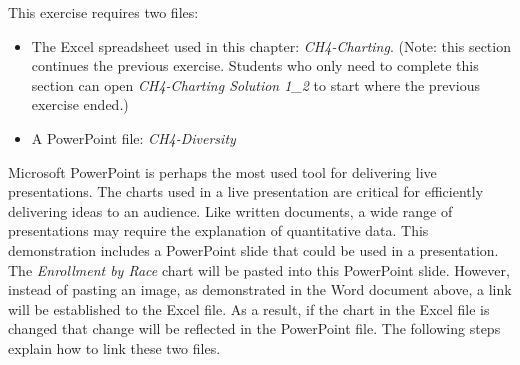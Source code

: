 This exercise requires two files:

\begin{itemize}
	\item The Excel spreadsheet used in this chapter: \textit{CH4-Charting}. (Note: this section continues the previous exercise. Students who only need to complete this section can open \textit{CH4-Charting Solution 1\_2} to start where the previous exercise ended.)
	\item A PowerPoint file: \textit{CH4-Diversity}
\end{itemize}

Microsoft PowerPoint is perhaps the most used tool for delivering live presentations. The charts used in a live presentation are critical for efficiently delivering ideas to an audience. Like written documents, a wide range of presentations may require the explanation of quantitative data. This demonstration includes a PowerPoint slide that could be used in a presentation. The \textit{Enrollment by Race} chart will be pasted into this PowerPoint slide. However, instead of pasting an image, as demonstrated in the Word document above, a link will be established to the Excel file. As a result, if the chart in the Excel file is changed that change will be reflected in the PowerPoint file. The following steps explain how to link these two files.

